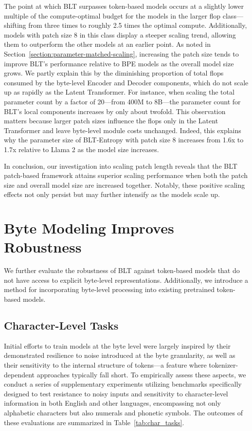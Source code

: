 The point at which {\textsc BLT} surpasses token-based models occurs at a slightly lower multiple of the compute-optimal budget for the models in the larger flop class—shifting from three times to roughly 2.5 times the optimal compute. Additionally, models with patch size 8 in this class display a steeper scaling trend, allowing them to outperform the other models at an earlier point. As noted in Section~\ref{section:parameter-matched-scaling}, increasing the patch size tends to improve {\textsc BLT}'s performance relative to BPE models as the overall model size grows. We partly explain this by the diminishing proportion of total flops consumed by the byte-level Encoder and Decoder components, which do not scale up as rapidly as the Latent Transformer. For instance, when scaling the total parameter count by a factor of 20—from 400M to 8B—the parameter count for {\textsc BLT}’s local components increases by only about twofold. This observation matters because larger patch sizes influence the flops only in the Latent Transformer and leave byte-level module costs unchanged. Indeed, this explains why the parameter size of {\textsc BLT}-Entropy with patch size 8 increases from 1.6x to 1.7x relative to Llama 2 as the model size increases.

In conclusion, our investigation into scaling patch length reveals that the {\textsc BLT} patch-based framework attains superior scaling performance when both the patch size and overall model size are increased together. Notably, these positive scaling effects not only persist but may further intensify as the models scale up.

\section{Byte Modeling Improves Robustness} We further evaluate the robustness of {\textsc BLT} against token-based models that do not have access to explicit byte-level representations. Additionally, we introduce a method for incorporating byte-level processing into existing pretrained token-based models.
\label{sec:robustness}

\subsection{Character-Level Tasks}

Initial efforts to train models at the byte level were largely inspired by their demonstrated resilience to noise introduced at the byte granularity, as well as their sensitivity to the internal structure of tokens—a feature where tokenizer-dependent approaches typically fall short. To empirically assess these aspects, we conduct a series of supplementary experiments utilizing benchmarks specifically designed to test resistance to noisy inputs and sensitivity to character-level information in both English and other languages, encompassing not only alphabetic characters but also numerals and phonetic symbols. The outcomes of these evaluations are summarized in Table~\ref{tab:char_tasks}.

